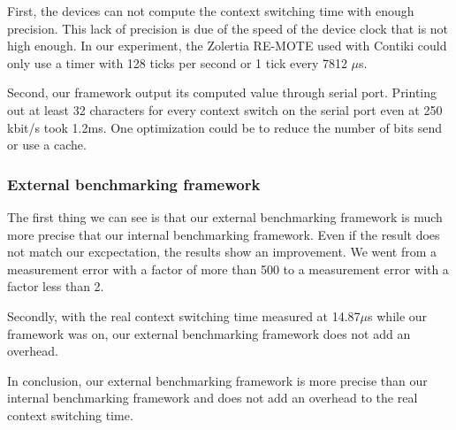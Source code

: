 First, the devices can not compute the context switching time with enough precision.
This lack of precision is due of the speed of the device clock that is not high enough.
In our experiment, the Zolertia RE-MOTE used with Contiki could only use a timer with 128 ticks per second or 1 tick every 7812 $\mu$s.

Second, our framework output its computed value through serial port.
Printing out at least 32 characters for every context switch on the serial port even at 250 kbit/s took 1.2ms.
One optimization could be to reduce the number of bits send or use a cache.

\subsubsection{External benchmarking framework}

The first thing we can see is that our external benchmarking framework is much more precise that our internal benchmarking framework.
Even if the result does not match our excpectation, the results show an improvement.
We went from a measurement error with a factor of more than 500 to a measurement error with a factor less than 2.

Secondly, with the real context switching time measured at 14.87$\mu$s while our framework was on, our external benchmarking framework does not add an overhead.

In conclusion, our external benchmarking framework is more precise than our internal benchmarking framework and does not add an overhead to the real context switching time.
